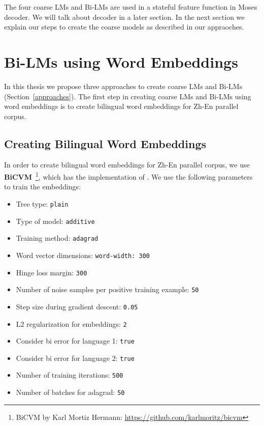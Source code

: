 The four coarse LMs and Bi-LMs are used in a stateful feature function in Moses decoder. We will talk about decoder in a later section. In the next section we explain our steps to create the coarse models as described in our appraoches.

\section{Bi-LMs using Word Embeddings}\label{three-approaches}
In this thesis we propose three approaches to create coarse LMs and Bi-LMs (Section~\ref{approaches}). The first step in creating coarse LMs and Bi-LMs using word embeddings is to create bilingual word embeddings for Zh-En parallel corpus.

\subsection{Creating Bilingual Word Embeddings}\label{three-embeddings}
In order to create bilingual word embeddings for Zh-En parallel corpus, we use \textbf{BiCVM}~\footnote{BiCVM by Karl Mortiz Hermann: \url{https://github.com/karlmoritz/bicvm}}, which has the implementation of \cite{Hermann14}. We use the following parameters to train the embeddings:
\begin{itemize}
	\item Tree type: \texttt{plain}
	\item Type of model: \texttt{additive}
	\item Training method: \texttt{adagrad}
	\item Word vector dimensions: \texttt{word-width: 300}
	\item Hinge loss margin: \texttt{300}
	\item Number of noise samples per positive training example: \texttt{50}
	\item Step size during gradient descent: \texttt{0.05}
	\item L2 regularization for embeddings: \texttt{2}
	\item Consider bi error for language 1: \texttt{true}
	\item Consider bi error for language 2: \texttt{true}
	\item Number of training iterations: \texttt{500}
	\item Number of batches for adagrad: \texttt{50}
\end{itemize}

